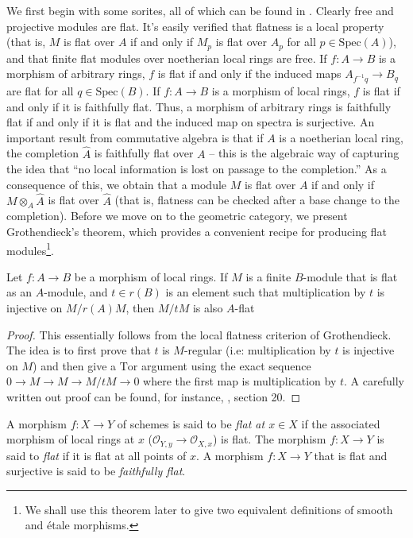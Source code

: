 \noindent
We first begin with some sorites, all of which can be found in \cite{MatCA}.
Clearly free and projective modules are flat. It's easily verified that
flatness is a local property (that is, $M$ is flat over $A$ if and only if
$M_p$ is flat over $A_p$ for all $p \in \text{Spec}(A)$), and that finite flat
modules over noetherian local rings are free. If $f:A \to B$ is a morphism of
arbitrary rings, $f$ is flat if and only if the induced maps
$A_{f^{-1}q} \to B_q$ are flat for all $q \in \text{Spec}(B)$. If $f:A \to B$ 
is a
morphism of local rings, $f$ is flat if and only if it is faithfully flat.
Thus, a morphism of arbitrary rings is faithfully flat if and only if it is
flat and the induced map on spectra is surjective. An important result from
commutative algebra is that if $A$ is a noetherian local ring, the completion
$\widehat{A}$ is faithfully flat over $A$ -- this is the algebraic way of
capturing the idea that ``no local information is lost on passage to the
completion.'' As a consequence of this, we obtain that a module $M$ is flat
over $A$ if and only if $M \otimes_A \widehat{A}$ is flat over $\widehat{A}$
(that is, flatness can be checked after a base change to the completion).
Before we move on to the geometric category, we present Grothendieck's
theorem, which provides a convenient recipe for producing flat
modules\footnote{We shall use this theorem later to give two equivalent
definitions of smooth and \'etale morphisms.}.

\begin{theorem}[Grothendieck]
\label{theorem-flatness-grothendieck}
Let $f:A \to B$ be a morphism of local rings. If $M$ is a finite $B$-module
that is flat as an $A$-module, and $t \in r(B)$ is an element such that
multiplication by $t$ is injective on $M/r(A)M$, then $M/tM$ is also
$A$-flat
\end{theorem}

\begin{proof}
This essentially follows from the local flatness criterion of Grothendieck.
The idea is to first prove that $t$ is $M$-regular (i.e: multiplication by
$t$ is injective on $M$) and then give a $\mathrm{Tor}$ argument using the
exact sequence $0 \to M \to M \to M/tM \to 0$ where the first map is
multiplication by $t$. A carefully written out proof can be found, for
instance, \cite{MatCA}, section 20.
\end{proof}

\begin{definition}
\label{definition-flat-schemes}
A morphism $f:X \to Y$ of schemes is said to be
{\it flat at $x \in X$} if the
associated morphism of local rings at $x$ 
($\mathcal{O}_{Y,y} \to \mathcal{O}_{X,x}$) is flat.
The morphism $f:X \to Y$ is said to {\it flat}
if it is flat at all points of $x$.
A morphism $f:X \to Y$ that is flat and surjective is said to be
{\it faithfully flat}.
\end{definition}

